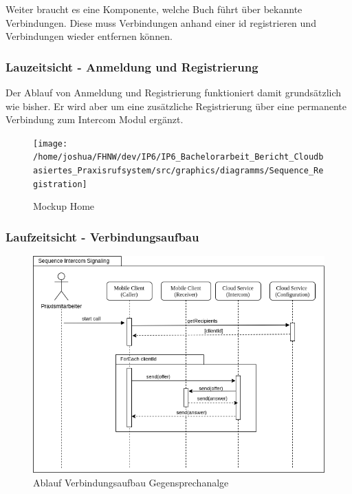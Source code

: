 \clearpage
Weiter braucht es eine Komponente, welche Buch führt über bekannte Verbindungen.
Diese muss Verbindungen anhand einer id registrieren und Verbindungen wieder entfernen können.



\clearpage

\subsubsection{Lauzeitsicht - Anmeldung und Registrierung}

Der Ablauf von Anmeldung und Registrierung funktioniert damit grundsätzlich wie bisher.
Er wird aber um eine zusätzliche Registrierung über eine permanente Verbindung zum Intercom Modul ergänzt.

\begin{figure}[h]
    \centering
    \begin{minipage}[b]{0.9\textwidth}
        \texttt{[image: /home/joshua/FHNW/dev/IP6/IP6\_Bachelorarbeit\_Bericht\_Cloudbasiertes\_Praxisrufsystem/src/graphics/diagramms/Sequence\_Registration]}
        \caption{Mockup Home}
    \end{minipage}
\end{figure}


\clearpage
\subsubsection{Laufzeitsicht - Verbindungsaufbau}

\begin{figure}[h]
    \centering
    \begin{minipage}[b]{0.9\textwidth}
        \includegraphics[width=\textwidth]{graphics/diagramms/Sequence_Intercom_Broking_V02}
        \caption{Ablauf Verbindungsaufbau Gegensprechanalge}
    \end{minipage}
\end{figure}

